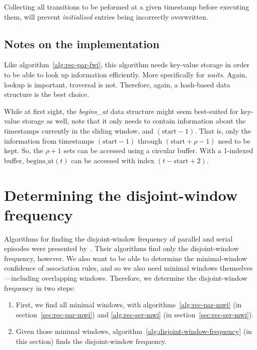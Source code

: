 Collecting all transitions to be peformed at a given timestamp before executing them, will prevent \emph{initialized} entries being incorrectly overwritten.

\subsection{Notes on the implementation}

Like algorithm~\ref{alg:rec-par-fwi}, this algorithm needs key-value storage in order to be able to look up information efficiently. More specifically for \emph{waits}. Again, lookup is important, traversal is not. Therefore, again, a hash-based data structure is the best choice.

While at first sight, the \emph{begins\_at} data structure might seem best-suited for key-value storage as well, note that it only needs to contain information about the timestamps currently in the sliding window, and $ (\text{start} - 1) $. That is, only the information from timestamps $ (\text{start} - 1) $ through $ (\text{start} + \rho - 1) $ need to be kept. So, the $ \rho + 1 $ sets can be accessed using a circular buffer. With a 1-indexed buffer, $ \text{begins\_at}(t) $ can be accessed with index $ (t - \text{start} + 2) $.



\section{Determining the disjoint-window frequency}
\label{sec:disjoint-window-frequency}

Algorithms for finding the disjoint-window frequency of parallel and serial episodes were presented by~\cite{laxman2007fast}. Their algorithms find only the disjoint-window frequency, however. We also want to be able to determine the minimal-window confidence of association rules, and so we also need minimal windows themselves---including overlapping windows. Therefore, we determine the disjoint-window frequency in two steps:
\begin{enumerate}
\item \label{enum-item:find-all-minimal-windows} First, we find all minimal windows, with algorithms~\ref{alg:rec-par-mwi} (in section~\ref{sec:rec-par-mwi}) and \ref{alg:rec-ser-mwi} (in section~\ref{sec:rec-ser-mwi}).
\item \label{enum-item:find-disjoint-window-frequency} Given those minimal windows, algorithm~\ref{alg:disjoint-window-frequency} (in this section) finds the disjoint-window frequency.
\end{enumerate}

